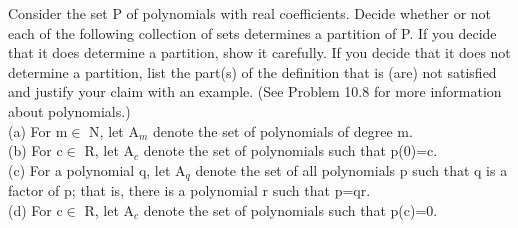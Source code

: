 \documentclass[11pt, a4paper, UTF8]{ctexart}
\begin{document}
\begin{problem}[UD:11.7]
Consider the set P of polynomials with real coefficients. Decide whether or not each of the following collection of sets determines a partition of P. If you decide that it does determine a partition, show it carefully. If you decide that it does not determine a partition, list the part(s) of the definition that is (are) not satisfied and justify your claim with an example. (See Problem 10.8 for more information about polynomials.)\\
(a) For m$\in$ N, let A$_m$ denote the set of polynomials of degree m.\\
(b) For c$\in$ R, let A$_c$ denote the set of polynomials such that p(0)=c.\\
(c) For a polynomial q, let A$_q$ denote the set of all polynomials p such that q is a factor of p; that is, there is a polynomial r such that p=qr.\\
(d) For c$\in$ R, let A$_c$ denote the set of polynomials such that p(c)=0.
\end{problem}
\end{document}
